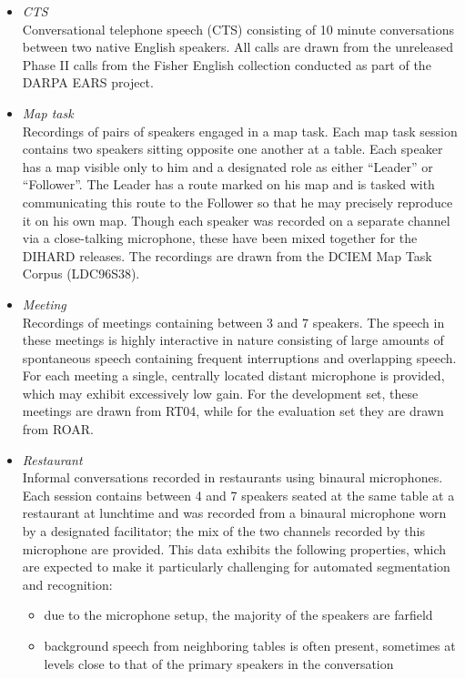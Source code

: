\documentclass{article}
\begin{document}
\begin{appendices}
\begin{itemize}
        \item {\it CTS} \\
            Conversational telephone speech (CTS) consisting of 10 minute conversations between two native English speakers. All calls are drawn from the unreleased Phase II calls from the Fisher English collection conducted as part of the DARPA EARS project.
        \item {\it Map task} \\
            Recordings of pairs of speakers engaged in  a map task. Each map task session contains two speakers sitting opposite one another at a table. Each speaker has a map visible only to him and a designated role as either ``Leader'' or ``Follower''. The Leader has a route marked on his map and is tasked with communicating this route to the Follower so that he may precisely reproduce it on his own map. Though each speaker was recorded on a separate channel via a close-talking microphone, these have been mixed together for the DIHARD releases. The recordings are drawn from the DCIEM Map Task Corpus (LDC96S38).
        \item {\it Meeting} \\
            Recordings of meetings containing between 3 and 7 speakers. The speech in these meetings is highly interactive in nature consisting of large amounts of spontaneous speech containing frequent interruptions and overlapping speech. For each meeting a single, centrally located distant microphone is provided, which may exhibit excessively low gain. For the development set, these meetings are drawn from RT04, while for the evaluation set they are drawn from ROAR.
        \item {\it Restaurant} \\
            Informal conversations recorded in restaurants using binaural microphones. Each session contains between 4 and 7 speakers seated at the same table at a restaurant at lunchtime and was recorded from a binaural microphone worn by a designated facilitator; the mix of the two channels recorded by this microphone are provided. This data exhibits the following properties, which are expected to make it particularly challenging for automated segmentation and recognition:
                \begin{itemize}
                    \item due to the microphone setup, the majority of the speakers are farfield
                    \item background speech from neighboring tables is often present, sometimes at levels close to that of the primary speakers in the conversation

\end{itemize}
\end{itemize}
\end{appendices}
\end{document}
